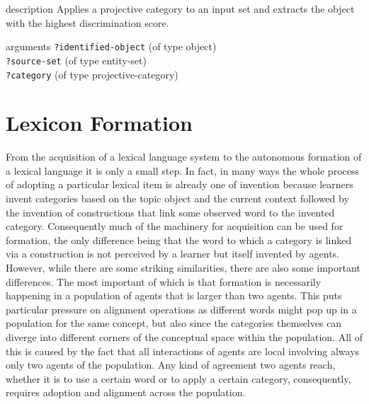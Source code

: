 \begin{explanation}{description}
Applies a projective category to an input set and extracts the 
object with the highest discrimination score.
\end{explanation}
\begin{explanation}{arguments}
{\footnotesize\verb+?identified-object+} (of type object) \\
{\footnotesize\verb+?source-set+} (of type entity-set) \\
{\footnotesize\verb+?category+} (of type projective-category)
\vspace{0.3cm}
\end{explanation}

\section{Lexicon Formation}
\label{s:category-formation}
From the acquisition of a lexical language system to the autonomous formation
of a lexical language it is only a small step. In fact, in many ways the 
whole process of adopting a particular lexical item is already one 
of invention because learners invent categories 
based on the topic object and the current context followed by the invention of 
constructions that link some observed word to the invented category. 
Consequently much of the machinery for acquisition can be
used for formation, the only difference being that the word to which a category
is linked via a construction is not perceived by a learner but itself invented by agents. 
However, while there are some striking similarities, there are also some important differences. 
The most important of which is that formation is necessarily happening in a population of agents that
is larger than two agents. This puts particular pressure on alignment operations as 
different words might pop up in a population for the same concept, but also 
since the categories themselves can diverge into different
corners of the conceptual space within the population. All of this is caused by the
fact that all interactions of agents are local involving always only
two agents of the population. Any kind of agreement two agents
reach, whether it is to use a certain word or to apply a certain category, consequently,
requires adoption and alignment across the population.

